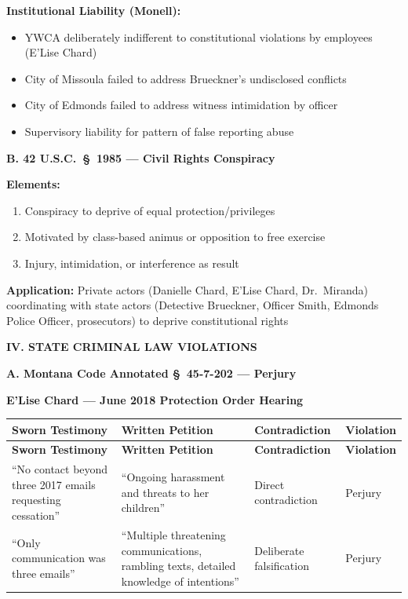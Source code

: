 \documentclass[11pt, letterpaper]{article}
\newcommand{\sectiontitle}[1]{\vspace{0.2in}\noindent\textcolor{NavyBlue}{\large\textbf{#1}}\vspace{0.1in}}
\newcommand{\subsectiontitle}[1]{\vspace{0.15in}\noindent\textcolor{NavyBlue}{\textbf{#1}}\vspace{0.05in}}
\begin{document}
\textbf{Institutional Liability (Monell):}
\begin{itemize}[leftmargin=*,itemsep=2pt]
    \item YWCA deliberately indifferent to constitutional violations by employees (E'Lise Chard)
    \item City of Missoula failed to address Brueckner's undisclosed conflicts
    \item City of Edmonds failed to address witness intimidation by officer
    \item Supervisory liability for pattern of false reporting abuse
\end{itemize}

\subsectiontitle{B. 42 U.S.C.\ \S\ 1985 --- Civil Rights Conspiracy}

\textbf{Elements:}
\begin{enumerate}[leftmargin=*,itemsep=2pt]
    \item Conspiracy to deprive of equal protection/privileges
    \item Motivated by class-based animus or opposition to free exercise
    \item Injury, intimidation, or interference as result
\end{enumerate}

\textbf{Application:} Private actors (Danielle Chard, E'Lise Chard, Dr.\ Miranda) coordinating with state actors (Detective Brueckner, Officer Smith, Edmonds Police Officer, prosecutors) to deprive constitutional rights

\sectiontitle{IV. STATE CRIMINAL LAW VIOLATIONS}

\subsectiontitle{A. Montana Code Annotated \S\ 45-7-202 --- Perjury}

\textbf{E'Lise Chard --- June 2018 Protection Order Hearing}

\begin{center}
\begin{longtable}{|p{1.8in}|p{1.8in}|p{1.1in}|p{0.8in}|}
\hline
\textbf{Sworn Testimony} & \textbf{Written Petition} & \textbf{Contradiction} & \textbf{Violation} \\
\hline
\endfirsthead
\hline
\textbf{Sworn Testimony} & \textbf{Written Petition} & \textbf{Contradiction} & \textbf{Violation} \\
\hline
\endhead
``No contact beyond three 2017 emails requesting cessation'' & ``Ongoing harassment and threats to her children'' & Direct contradiction & Perjury \\
\hline
``Only communication was three emails'' & ``Multiple threatening communications, rambling texts, detailed knowledge of intentions'' & Deliberate falsification & Perjury \\
\hline
\end{longtable}
\end{center}
\end{document}
